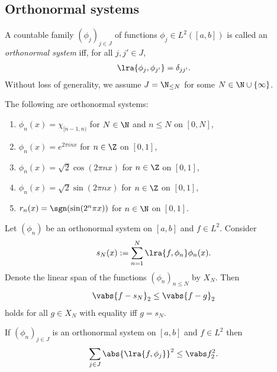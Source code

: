 \documentclass{article}
\begin{document}
\subsection{Orthonormal systems}

\begin{definition}
	A countable family $(\phi_j)_{j\in J}$ of functions $\phi_j\in L^2([a,b])$ is
	called an \emph{orthonormal system} iff, for all $j,j'\in J$,
	\begin{align*}
		\lra{\phi_j, \phi_{j'}} = \delta_{jj'}.
	\end{align*}
	Without loss of generality, we assume $J=\N_{\leq N}$ for some $N\in\N\cup\{\infty\}$.
\end{definition}

\begin{lemma}
	The following are orthonormal systems:
	\begin{enumerate}
		\item $\phi_n(x)=\chi_{[n-1,n)}$ for $N\in\N$ and $n\leq N$ on $[0,N]$,
		\item $\phi_n(x)=e^{2\pi inx}$ for $n\in\Z$ on $[0,1]$,
		\item $\phi_n(x)=\sqrt 2\cos(2\pi nx)$ for $n\in\Z$ on $[0,1]$,
		\item $\phi_n(x)=\sqrt 2\sin(2\pi nx)$ for $n\in\Z$ on $[0,1]$,
		\item $r_n(x)=\sgn(\sin(2^n\pi x))$ for $n\in\N$ on $[0,1]$.
	\end{enumerate}
\end{lemma}

\begin{theorem}[Notes 5.2]
	Let $(\phi_n)$ be an orthonormal system on $[a,b]$ and $f\in L^2$. Consider
	\begin{align}
		\label{sn}
		s_N(x) := \sum_{n=1}^N \lra{f,\phi_n}\phi_n(x).
	\end{align}
	Denote the linear span of the functions $(\phi_n)_{n\leq N}$ by $X_N$. Then
	\begin{align*}
		\vabs{f-s_N}_2 \leq \vabs{f-g}_2
	\end{align*}
	holds for all $g\in X_N$ with equality iff $g=s_N$.
\end{theorem}

\begin{theorem}
	If $(\phi_n)_{j\in J}$ is an orthonormal system on $[a,b]$ and $f\in L^2$ then
	\begin{align*}
		\sum_{j\in J} \abs{\lra{f,\phi_j}}^2 \leq \vabs f_2^2.
	\end{align*}
\end{theorem}
\end{document}
